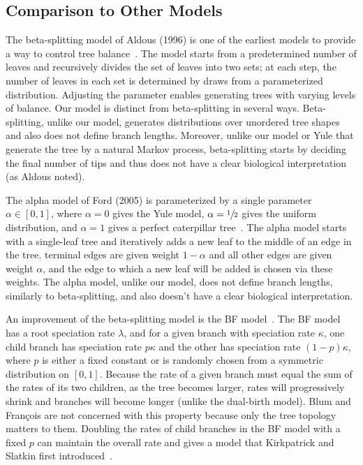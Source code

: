 \subsection{Comparison to Other Models}
The beta-splitting model of Aldous (1996) is one of the earliest models to provide a way to control tree balance~\cite{Aldous1996}. The model starts from a predetermined number of leaves and recursively divides the set of leaves into two sets; at each step, the number of leaves in each set is determined by draws from a parameterized distribution. Adjusting the parameter enables generating trees with varying levels of balance. Our model is distinct from beta-splitting in several ways. Beta-splitting, unlike our model, generates distributions over unordered tree shapes and also does not define branch lengths. Moreover, unlike our model or Yule that generate the tree by a natural Markov process, beta-splitting starts by deciding the final number of tips and thus does not have a clear biological interpretation (as Aldous noted).

The alpha model of Ford (2005) is parameterized by a single parameter $\alpha\in[0,1]$, where $\alpha=0$ gives the Yule model, $\alpha=\sfrac{1}{2}$ gives the uniform distribution, and $\alpha = 1$ gives a perfect caterpillar tree~\cite{Ford2005}. The alpha model starts with a single-leaf tree and iteratively adds a new leaf to the middle of an edge in the tree. terminal edges are given weight $1-\alpha$ and all other edges are given weight $\alpha$, and the edge to which a new leaf will be added is chosen via these weights. The alpha model, unlike our model, does not define branch lengths, similarly to beta-splitting, and also doesn't have a clear biological interpretation.

An improvement of the beta-splitting model is the \gls{BF} model~\cite{Blum2006}. The \gls{BF} model has a root speciation rate $\lambda$, and for a given branch with speciation rate $\kappa$, one child branch has speciation rate $p\kappa$ and the other has speciation rate $(1-p)\kappa$, where $p$ is either a fixed constant or is randomly chosen from a symmetric distribution on $[0,1]$. Because the rate of a given branch must equal the sum of the rates of its two children, as the tree becomes larger, rates will progressively shrink and branches will become longer (unlike the dual-birth model). Blum and Fran\c{c}ois are not concerned with this property because only the tree topology matters to them. Doubling the rates of child branches in the \gls{BF} model with a fixed $p$ can maintain the overall rate and gives a model that Kirkpatrick and Slatkin first introduced~\cite{Kirkpatrick1993}.

